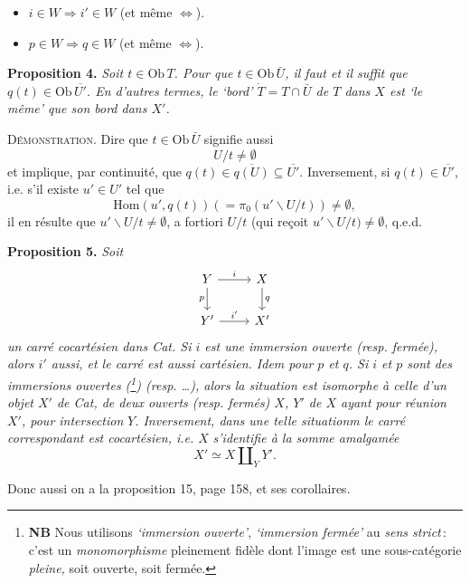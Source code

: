 \documentclass[11pt]{article}
\newcommand{\printedpage}[1]{\marginpar{\footnotesize p.~#1}}
\newcommand{\msp}[1]{\marginpar{\footnotesize [#1]}}
\newcommand{\Hom}{\mathrm{Hom}}
\newcommand{\Ob}{\mathrm{Ob}\,}
\begin{document}
\begin{itemize}
\item[a)] $i\in W\Longrightarrow i'\in W$ (et même $\Longleftrightarrow$).
\item[b)] $p\in W\Longrightarrow q\in W$ (et même $\Longleftrightarrow$).
\end{itemize}

\msp{page 75}
\textbf{Proposition 4.} \textit{Soit $t\in\Ob T$. Pour que $t\in\Ob\bar{U}$, il faut et il suffit que $q(t)\in\Ob\overline{U'}$. En d'autres termes, le `bord' $\dot{T}=T\cap\bar{U}$ de $T$ dans $X$ est `le même' que son bord dans $X'$.}

\textsc{Démonstration}. Dire que $t\in\Ob\bar{U}$ signifie aussi
\[
U/t\neq\emptyset
\]
et implique, par continuité, que $q(t)\in\overline{q(U)}\subseteq\overline{U'}$. Inversement, si $q(t)\in\overline{U'}$, i.e. s'il existe $u'\in U'$ tel que
\[
\Hom(u',q(t))(=\pi_0(u'\backslash U/t))\neq\emptyset,
\]
il en résulte que $u'\backslash U/t\neq\emptyset$, a fortiori $U/t$ (qui reçoit $u'\backslash U/t)\neq\emptyset$, q.e.d.

\textbf{Proposition 5.} \textit{Soit}
\[
\begin{tikzcd}
Y \arrow[r, "i"] \arrow[d, "p"'] & X \arrow[d, "q"] \\
Y' \arrow[r, "i'"] & X'
\end{tikzcd}
\]
\printedpage{54}
\textit{un carré cocartésien dans \textup{Cat}. Si $i$ est une immersion ouverte (resp. fermée), alors $i'$ aussi, et le carré est aussi cartésien. Idem pour $p$ et $q$. Si $i$ et $p$ sont des immersions ouvertes (\footnote{\textbf{NB} Nous utilisons \textit{`immersion ouverte'}, \textit{`immersion fermée'} au \textit{sens strict}\,: c'est un \textit{monomorphisme} pleinement fidèle dont l'image est une sous-catégorie \textit{pleine,} soit ouverte, soit fermée.}) (resp. \dots), alors la situation est isomorphe à celle d'un objet $X'$ de \textup{Cat}, de deux ouverts (resp. fermés) $X$, $Y'$ de $X$ ayant pour réunion $X'$, pour intersection} %
\textit{$Y$. Inversement, dans une telle situationm le carré correspondant est cocartésien, i.e. $X$} %
 \textit{s'identifie à la somme amalgamée}
\[
X'\simeq X\amalg_{Y}Y'.
\]

Donc aussi on a la proposition 15, page 158, et ses corollaires.

\printedpage{55}
\end{document}
